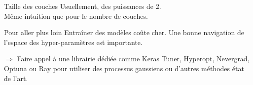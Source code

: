 \begin{frame}{Taille des couches}
  Usuellement, des puissances de 2. \\
  Même intuition que pour le nombre de couches.
\end{frame}

\begin{frame}{Pour aller plus loin}
  Entraîner des modèles coûte cher.
  Une bonne navigation de l'espace des hyper-paramètres est importante.

  $\Rightarrow$ Faire appel à une librairie dédiée comme Keras Tuner, Hyperopt, Nevergrad, Optuna ou Ray pour utiliser des processus gaussiens ou d'autres méthodes état de l'art.
\end{frame}
